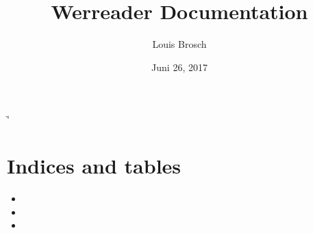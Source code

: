 \documentclass[letterpaper,10pt,ngerman]{sphinxmanual}
\title{Werreader Documentation}
\date{Juni 26, 2017}
\author{Louis Brosch}
\begin{document}
\if\catcode`\"\active{}\fi
\maketitle
\sphinxtableofcontents
{}\label{\detokenize{index::doc}}



\chapter{Indices and tables}
\label{\detokenize{index:indices-and-tables}}\label{\detokenize{index:welcome-to-werreader-s-documentation}}\begin{itemize}
\item {} 

\item {} 

\item {} 

\end{itemize}



\renewcommand{\indexname}{Stichwortverzeichnis}
\printindex
\end{document}
